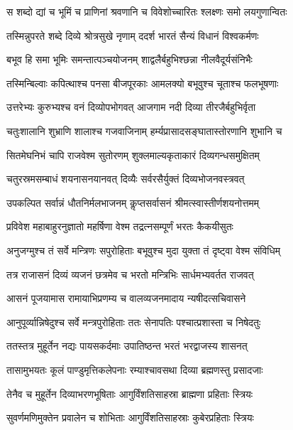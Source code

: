 \twolineshloka
{स शब्दो द्यां च भूमिं च प्राणिनां श्रवणानि च}
{विवेशोच्चारितः श्लक्ष्णः समो लयगुणान्वितः} %

\twolineshloka
{तस्मिन्नुपरते शब्दे दिव्ये श्रोत्रसुखे नृणाम्}
{ददर्श भारतं सैन्यं विधानं विश्वकर्मणः} %

\twolineshloka
{बभूव हि समा भूमिः समन्तात्पञ्चयोजनम्}
{शाद्वलैर्बहुभिश्छन्ना नीलवैदूर्यसंनिभैः} %

\twolineshloka
{तस्मिन्बिल्वाः कपित्थाश्च पनसा बीजपूरकाः}
{आमलक्यो बभूवुश्च चूताश्च फलभूषणाः} %

\twolineshloka
{उत्तरेभ्यः कुरुभ्यश्च वनं दिव्योपभोगवत्}
{आजगाम नदी दिव्या तीरजैर्बहुभिर्वृता} %

\twolineshloka
{चतुःशालानि शुभ्राणि शालाश्च गजवाजिनाम्}
{हर्म्यप्रासादसङ्घातास्तोरणानि शुभानि च} %

\twolineshloka
{सितमेघनिभं चापि राजवेश्म सुतोरणम्}
{शुक्लमाल्यकृताकारं दिव्यगन्धसमुक्षितम्} %

\twolineshloka
{चतुरस्रमसम्बाधं शयनासनयानवत्}
{दिव्यैः सर्वरसैर्युक्तं दिव्यभोजनवस्त्रवत्} %

\twolineshloka
{उपकल्पित सर्वान्नं धौतनिर्मलभाजनम्}
{कॢप्तसर्वासनं श्रीमत्स्वास्तीर्णशयनोत्तमम्} %

\twolineshloka
{प्रविवेश महाबाहुरनुज्ञातो महर्षिणा}
{वेश्म तद्रत्नसम्पूर्णं भरतः कैकयीसुतः} %

\twolineshloka
{अनुजग्मुश्च तं सर्वे मन्त्रिणः सपुरोहिताः}
{बभूवुश्च मुदा युक्ता तं दृष्ट्वा वेश्म संविधिम्} %

\twolineshloka
{तत्र राजासनं दिव्यं व्यजनं छत्रमेव च}
{भरतो मन्त्रिभिः सार्धमभ्यवर्तत राजवत्} %

\twolineshloka
{आसनं पूजयामास रामायाभिप्रणम्य च}
{वालव्यजनमादाय न्यषीदत्सचिवासने} %

\twolineshloka
{आनुपूर्व्यान्निषेदुश्च सर्वे मन्त्रपुरोहिताः}
{ततः सेनापतिः पश्चात्प्रशास्ता च निषेदतुः} %

\twolineshloka
{ततस्तत्र मुहूर्तेन नद्यः पायसकर्दमाः}
{उपातिष्ठन्त भरतं भरद्वाजस्य शासनत्} %

\twolineshloka
{तासामुभयतः कूलं पाण्डुमृत्तिकलेपनाः}
{रम्याश्चावसथा दिव्या ब्रह्मणस्तु प्रसादजाः} %

\twolineshloka
{तेनैव च मुहूर्तेन दिव्याभरणभूषिताः}
{आगुर्विंशतिसाहस्रा ब्राह्मणा प्रहिताः स्त्रियः} %

\twolineshloka
{सुवर्णमणिमुक्तेन प्रवालेन च शोभिताः}
{आगुर्विंशतिसाहस्राः कुबेरप्रहिताः स्त्रियः} %

